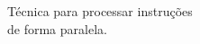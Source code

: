 \documentclass[preview]{standalone}
\begin{document}
Técnica para processar instruções\\de forma paralela.\\
\end{document}
